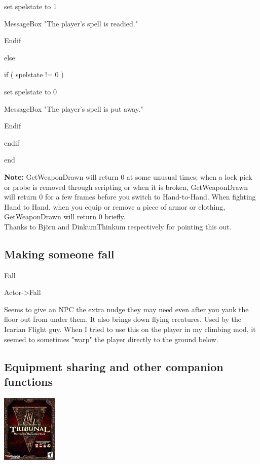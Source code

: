 \documentclass[
]{article}
\begin{document}
set spelstate to 1

MessageBox "The player's spell is readied."

Endif

else

if ( spelstate != 0 )

set spelstate to 0

MessageBox "The player's spell is put away."

Endif

endif

end

\textbf{Note:} GetWeaponDrawn will return 0 at some unusual times; when
a lock pick or probe is removed through scripting or when it is broken,
GetWeaponDrawn will return 0 for a few frames before you switch to
Hand-to-Hand. When fighting Hand to Hand, when you equip or remove a
piece of armor or clothing, GetWeaponDrawn will return 0 briefly.\\
Thanks to Björn and DinkumThinkum respectively for pointing this out.

\hypertarget{section-7}{%
\subsection{}\label{section-7}}

\hypertarget{making-someone-fall}{%
\subsection{Making someone fall}\label{making-someone-fall}}

Fall

Actor-\textgreater Fall

Seems to give an NPC the extra nudge they may need even after you yank
the floor out from under them. It also brings down flying creatures.
Used by the Icarian Flight guy. When I tried to use this on the player
in my climbing mod, it seemed to sometimes "warp" the player directly to
the ground below.

\hypertarget{equipment-sharing-and-other-companion-functions}{%
\subsection{Equipment sharing and other companion
functions}\label{equipment-sharing-and-other-companion-functions}}

\includegraphics{media/image6.png}
\end{document}
